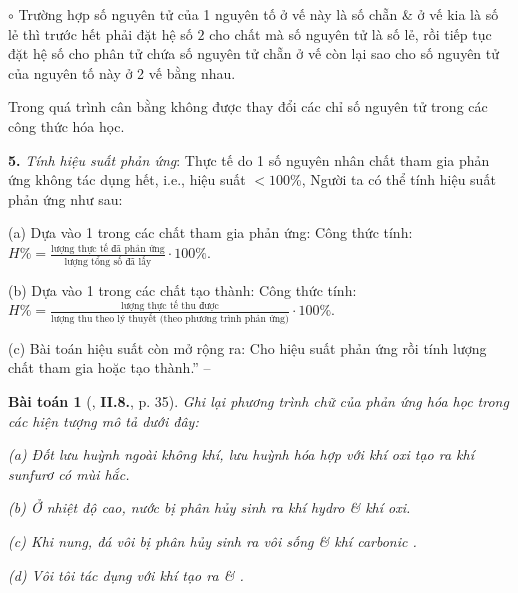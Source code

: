 \documentclass{article}
\numberwithin{equation}{section}
\newtheorem{baitoan}{Bài toán}
\begin{document}
\begin{enumerate*}
\begin{enumerate*}
\begin{enumerate*}
			\item[$\circ$] Trường hợp số nguyên tử của 1 nguyên tố ở vế này là số chẵn \& ở vế kia là số lẻ thì trước hết phải đặt hệ số $2$ cho chất mà số nguyên tử là số lẻ, rồi tiếp tục đặt hệ số cho phân tử chứa số nguyên tử chẵn ở vế còn lại sao cho số nguyên tử của nguyên tố này ở 2 vế bằng nhau.
		\end{enumerate*}
	\end{enumerate*}
	Trong quá trình cân bằng không được thay đổi các chỉ số nguyên tử trong các công thức hóa học.
	\item[\textbf{5.}] \textit{Tính hiệu suất phản ứng}: Thực tế do 1 số nguyên nhân chất tham gia phản ứng không tác dụng hết, i.e., hiệu suất $< 100$\%, Người ta có thể tính hiệu suất phản ứng như sau:
	\begin{enumerate*}
		\item[(a)] Dựa vào 1 trong các chất tham gia phản ứng: Công thức tính: $H\% = \frac{\mbox{lượng thực tế đã phản ứng}}{\mbox{lượng tổng số đã lấy}}\cdot100\%$.
		\item[(b)] Dựa vào 1 trong các chất tạo thành: Công thức tính: $H\% = \frac{\mbox{lượng thực tế thu được}}{\mbox{lượng thu theo lý thuyết (theo phương trình phản ứng)}}\cdot100\%$.
		\item[(c)] Bài toán hiệu suất còn mở rộng ra: Cho hiệu suất phản ứng rồi tính lượng chất tham gia hoặc tạo thành.'' -- \cite[Chap. 2, pp. 44--46]{An_400_BT_Hoa_Hoc_8_2020}
	\end{enumerate*}
\end{enumerate*}

\begin{baitoan}[\cite{Truong2021}, \textbf{II.8.}, p. 35]
	Ghi lại phương trình chữ của phản ứng hóa học trong các hiện tượng mô tả dưới đây:
	\begin{enumerate*}
		\item[(a)] Đốt lưu huỳnh ngoài không khí, lưu huỳnh hóa hợp với khí oxi tạo ra khí sunfurơ \emph{} có mùi hắc.
		\item[(b)] Ở nhiệt độ cao, nước bị phân hủy sinh ra khí hydro \& khí oxi.
		\item[(c)] Khi nung, đá vôi \emph{} bị phân hủy sinh ra vôi sống \emph{} \& khí carbonic \emph{}.
		\item[(d)] Vôi tôi \emph{} tác dụng với khí \emph{} tạo ra \emph{} \& \emph{}.
	\end{enumerate*}
\end{baitoan}
\end{document}
